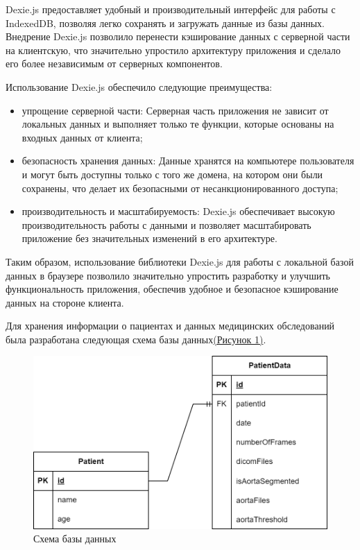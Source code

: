 Dexie.js предоставляет удобный и производительный интерфейс для работы с IndexedDB, позволяя легко сохранять и загружать данные из базы данных. Внедрение Dexie.js позволило перенести кэширование данных с серверной части на клиентскую, что значительно упростило архитектуру приложения и сделало его более независимым от серверных компонентов.

Использование Dexie.js обеспечило следующие преимущества:

\begin{itemize}
    \item упрощение серверной части: Серверная часть приложения не зависит от локальных данных и выполняет только те функции, которые основаны на входных данных от клиента;
    \item безопасность хранения данных: Данные хранятся на компьютере пользователя и могут быть доступны только с того же домена, на котором они были сохранены, что делает их безопасными от несанкционированного доступа;
    \item производительность и масштабируемость: Dexie.js обеспечивает высокую производительность работы с данными и позволяет масштабировать приложение без значительных изменений в его архитектуре.
\end{itemize}

Таким образом, использование библиотеки Dexie.js для работы с локальной базой данных в браузере позволило значительно упростить разработку и улучшить функциональность приложения, обеспечив удобное и безопасное кэширование данных на стороне клиента.

Для хранения информации о пациентах и данных медицинских обследований была разработана следующая схема базы данных\hyperref[fig:bird1]{(Рисунок \ref*{fig:db_scheme})}.

    \begin{figure}[ht]
        \centering
        \includegraphics[]{images/chap3/db.drawio.png}
        \caption{Схема базы данных}
        \label{fig:db_scheme}
    \end{figure}
    
